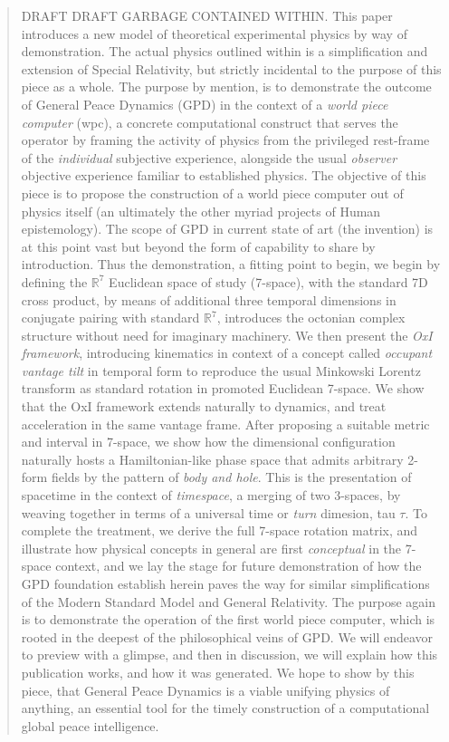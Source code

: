\documentclass{article}
\begin{document}
\begin{abstract}
DRAFT DRAFT GARBAGE CONTAINED WITHIN.
{\small \noindent This paper introduces a new model of theoretical experimental physics by way of demonstration. The actual physics outlined within is a simplification and extension of Special Relativity, but strictly incidental to the purpose of this piece as a whole. The purpose by mention, is to demonstrate the outcome of General Peace Dynamics (GPD) in the context of a {\em world piece computer} (wpc), a concrete computational construct that serves the operator by framing the activity of physics from the privileged rest-frame of the {\em individual} subjective experience, alongside the usual {\em observer} objective experience familiar to established physics. The objective of this piece is to propose the construction of a world piece computer out of physics itself (an ultimately the other myriad projects of Human epistemology). The scope of GPD in current state of art (the invention) is at this point vast but beyond the form of capability to share by introduction. Thus the demonstration, a fitting point to begin, we begin by defining the $\mathbb{R}^7$ Euclidean space of study (7-space), with the standard 7D cross product, by means of additional three temporal dimensions in conjugate pairing with standard $\mathbb{R}^7$, introduces the octonian complex structure without need for imaginary machinery. We then present the {\em OxI framework}, introducing kinematics in context of a concept called {\em occupant vantage tilt} in temporal form to reproduce the usual Minkowski Lorentz transform as standard rotation in promoted Euclidean 7-space. We show that the OxI framework extends naturally to dynamics, and treat acceleration in the same vantage frame. After proposing a suitable metric and interval in 7-space, we show how the dimensional configuration naturally hosts a Hamiltonian-like phase space that admits arbitrary 2-form fields by the pattern of {\em body and hole}. This is the presentation of spacetime in the context of {\em timespace}, a merging of two 3-spaces, by weaving together in terms of a universal time or {\em turn} dimesion, tau $\tau$. To complete the treatment, we derive the full 7-space rotation matrix, and illustrate how physical concepts in general are first {\em conceptual} in the 7-space context, and we lay the stage for future demonstration of how the GPD foundation establish herein paves the way for similar simplifications of the Modern Standard Model and General Relativity. The purpose again is to demonstrate the operation of the first world piece computer, which is rooted in the deepest of the philosophical veins of GPD. We will endeavor to preview with a glimpse, and then in discussion, we will explain how this publication works, and how it was generated. We hope to show by this piece, that General Peace Dynamics is a viable unifying physics of anything, an essential tool for the timely construction of a computational global peace intelligence.}
\end{abstract}
\end{document}
